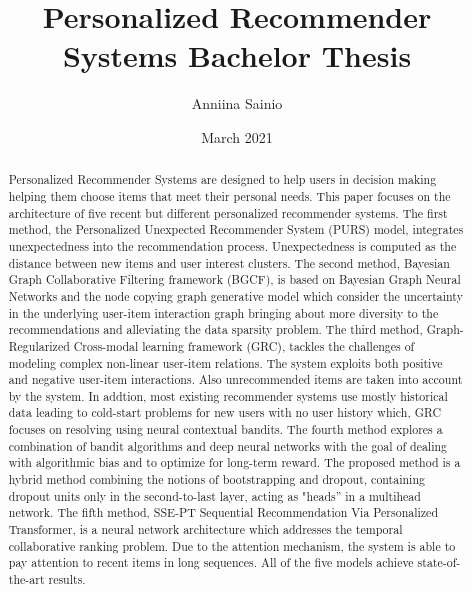 \documentclass[english,twoside,censored,tkt,sw-line]{HYthesisML}
\title{
Personalized Recommender Systems
        Bachelor Thesis}
\author{Anniina Sainio}
\date{March 2021}
\begin{document}
\maketitle
\begin{otherlanguage}{english}
\begin{abstract}
Personalized Recommender Systems are designed to help users in decision making helping them choose items that meet their personal needs. This paper focuses on the architecture of five recent but different personalized recommender systems. The first method, the Personalized Unexpected Recommender System (PURS) model, integrates unexpectedness into the recommendation process. Unexpectedness is computed as the distance between new items and user interest clusters. The second method, Bayesian Graph Collaborative Filtering framework (BGCF), is based on Bayesian Graph Neural Networks and the node copying graph generative model which consider the uncertainty in the underlying user-item interaction graph bringing about more diversity to the recommendations and alleviating the data sparsity problem. The third method, Graph-Regularized Cross-modal learning framework (GRC), tackles the challenges of modeling complex non-linear user-item relations. The system exploits both positive and negative user-item interactions. Also unrecommended items are taken into account by the system. In addtion, most existing recommender systems use mostly historical data leading to cold-start problems for new users with no user history which, GRC focuses on resolving using neural contextual bandits. The fourth method explores a combination of bandit algorithms and deep neural networks with the goal of dealing with algorithmic bias and to optimize for long-term reward. The proposed method is a hybrid method combining the notions of bootstrapping and dropout, containing dropout units only in the second-to-last layer, acting as "heads” in a multihead network. The fifth method, SSE-PT Sequential Recommendation Via Personalized Transformer, is a neural network architecture which addresses the temporal collaborative ranking problem. Due to the attention mechanism, the system is able to pay attention to recent items in long sequences. All of the five models achieve state-of-the-art results.  

\end{abstract}
\end{otherlanguage}

\newpage
\mytableofcontents
\frontmatter
\mainmatter

{}  
\printbibliography
\end{document}
